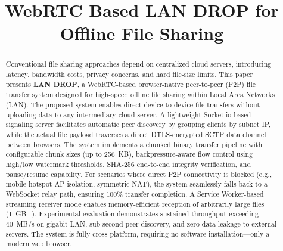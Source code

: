 \documentclass[conference]{IEEEtran}
\begin{document}
\title{WebRTC Based LAN DROP for Offline File Sharing}

\author{
\and
{}
}

\maketitle

\begin{abstract}
Conventional file sharing approaches depend on centralized cloud servers, introducing latency, bandwidth costs, privacy concerns, and hard file-size limits. This paper presents \textbf{LAN DROP}, a WebRTC-based browser-native peer-to-peer (P2P) file transfer system designed for high-speed offline file sharing within Local Area Networks (LAN). The proposed system enables direct device-to-device file transfers without uploading data to any intermediary cloud server. A lightweight Socket.io-based signaling server facilitates automatic peer discovery by grouping clients by subnet IP, while the actual file payload traverses a direct DTLS-encrypted SCTP data channel between browsers. The system implements a chunked binary transfer pipeline with configurable chunk sizes (up to 256~KB), backpressure-aware flow control using high/low watermark thresholds, SHA-256 end-to-end integrity verification, and pause/resume capability. For scenarios where direct P2P connectivity is blocked (e.g., mobile hotspot AP isolation, symmetric NAT), the system seamlessly falls back to a WebSocket relay path, ensuring 100\% transfer completion. A Service Worker-based streaming receiver mode enables memory-efficient reception of arbitrarily large files (1~GB+). Experimental evaluation demonstrates sustained throughput exceeding 40~MB/s on gigabit LAN, sub-second peer discovery, and zero data leakage to external servers. The system is fully cross-platform, requiring no software installation---only a modern web browser.
\end{abstract}
\end{document}
